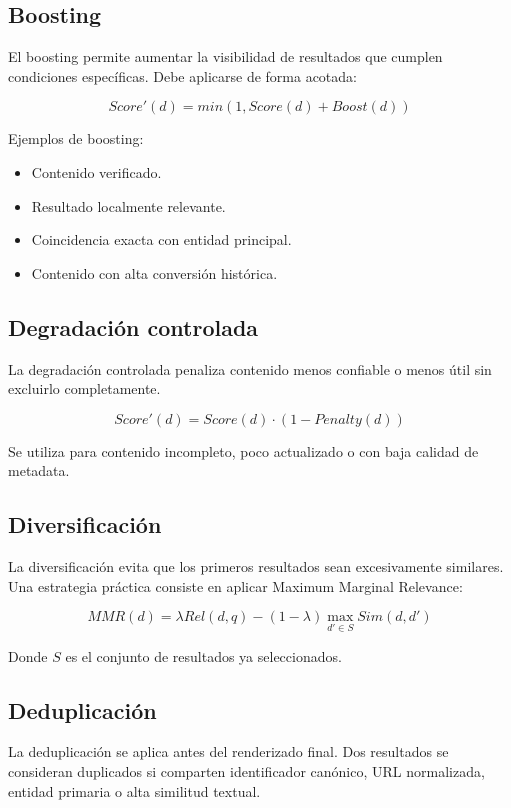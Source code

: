 \documentclass[12pt,a4paper]{article}
\begin{document}
\subsection{Boosting}

El boosting permite aumentar la visibilidad de resultados que cumplen condiciones específicas. Debe aplicarse de forma acotada:

\[
Score'(d) = min(1, Score(d) + Boost(d))
\]

Ejemplos de boosting:

\begin{itemize}[noitemsep]
    \item Contenido verificado.
    \item Resultado localmente relevante.
    \item Coincidencia exacta con entidad principal.
    \item Contenido con alta conversión histórica.
\end{itemize}

\subsection{Degradación controlada}

La degradación controlada penaliza contenido menos confiable o menos útil sin excluirlo completamente.

\[
Score'(d) = Score(d) \cdot (1 - Penalty(d))
\]

Se utiliza para contenido incompleto, poco actualizado o con baja calidad de metadata.

\subsection{Diversificación}

La diversificación evita que los primeros resultados sean excesivamente similares. Una estrategia práctica consiste en aplicar Maximum Marginal Relevance:

\[
MMR(d) = \lambda Rel(d,q) - (1-\lambda) \max_{d' \in S} Sim(d,d')
\]

Donde $S$ es el conjunto de resultados ya seleccionados.

\subsection{Deduplicación}

La deduplicación se aplica antes del renderizado final. Dos resultados se consideran duplicados si comparten identificador canónico, URL normalizada, entidad primaria o alta similitud textual.
\end{document}
